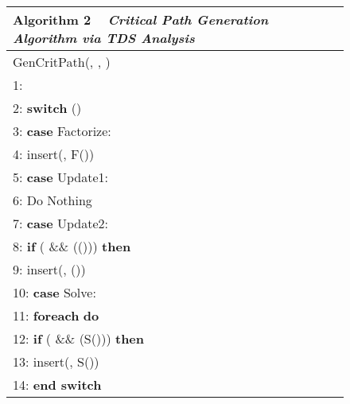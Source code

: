 \documentclass[12pt]{elsarticle}
\begin{document}
\begin{figure}\centering
\begin{tabular}{@{}p{\columnwidth}@{}}
\toprule
\textbf{Algorithm 2} ~ \textit{Critical Path Generation Algorithm via TDS Analysis}
\\\midrule
\textsf{GenCritPath}\textsf{(}, , \textsf{)}\\
\hspace{2.09mm}1:   \\
\hspace{2.09mm}2: \textbf{switch} ()\\
\hspace{2.09mm}3: \quad \textbf{case} \textsf{Factorize}:\\
\hspace{2.09mm}4: \quad\quad \textsf{insert(, F())}\\
\hspace{2.09mm}5: \quad \textbf{case} \textsf{Update1}:\\
\hspace{2.09mm}6: \quad\quad \textsf{Do Nothing}\\
\hspace{2.09mm}7: \quad \textbf{case} \textsf{Update2}:\\
\hspace{2.09mm}8: \quad\quad \textbf{if} ( \&\& \textsf{(())}) \textbf{then}\\
\hspace{2.09mm}9: \quad\quad\quad \textsf{insert(, ())}\\
10: \quad \textbf{case} \textsf{Solve}:\\
11: \quad\quad \textbf{foreach}  \textbf{do}\\
12: \quad\quad\quad \textbf{if} ( \&\& \textsf{(S())}) \textbf{then}\\13: \quad\quad\quad\quad \textsf{insert(, S())}\\
14: \textbf{end switch}\\
\midrule
\end{tabular}
\end{figure}
\end{document}
